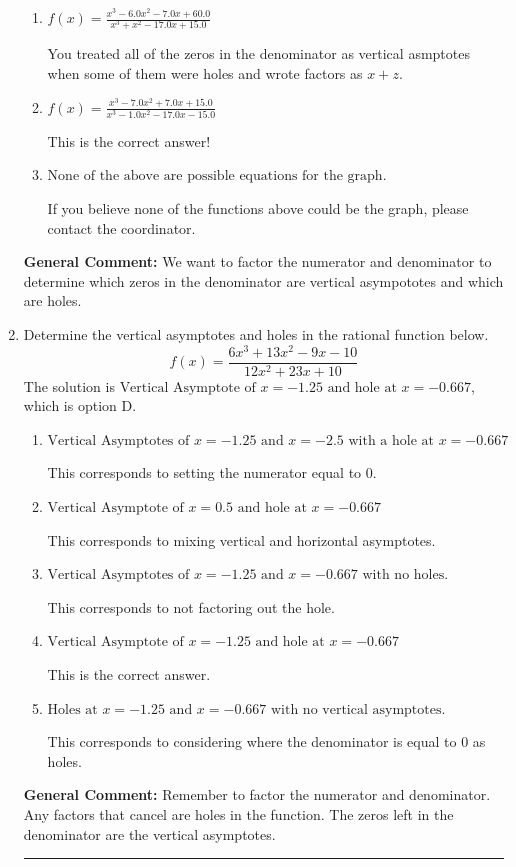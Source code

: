 \documentclass{extbook}[14pt]
\newcommand{\litem}[1]{\item #1

\rule{\textwidth}{0.4pt}}
\begin{document}
\begin{enumerate}
{\begin{enumerate}[label=\Alph*.]
You treated all of the zeros in the denominator as vertical asymptotes when some of them were holes!
\item \( f(x)=\frac{x^{3} -6.0 x^{2} -7.0 x + 60.0}{x^{3} + x^{2} -17.0 x + 15.0} \)

You treated all of the zeros in the denominator as vertical asmptotes when some of them were holes and wrote factors as $x+z$.
\item \( f(x)=\frac{x^{3} -7.0 x^{2} +7.0 x + 15.0}{x^{3} -1.0 x^{2} -17.0 x -15.0} \)

This is the correct answer!
\item \( \text{None of the above are possible equations for the graph.} \)

If you believe none of the functions above could be the graph, please contact the coordinator.
\end{enumerate}

\textbf{General Comment:} We want to factor the numerator and denominator to determine which zeros in the denominator are vertical asympototes and which are holes.
}
\litem{
Determine the vertical asymptotes and holes in the rational function below.
\[ f(x) = \frac{6x^{3} +13 x^{2} -9 x -10}{12x^{2} +23 x + 10} \]The solution is \( \text{Vertical Asymptote of } x = -1.25 \text{ and hole at } x = -0.667 \), which is option D.\begin{enumerate}[label=\Alph*.]
\item \( \text{Vertical Asymptotes of } x = -1.25 \text{ and } x = -2.5 \text{ with a hole at } x = -0.667 \)

This corresponds to setting the numerator equal to 0.
\item \( \text{Vertical Asymptote of } x = 0.5 \text{ and hole at } x = -0.667 \)

This corresponds to mixing vertical and horizontal asymptotes.
\item \( \text{Vertical Asymptotes of } x = -1.25 \text{ and } x = -0.667 \text{ with no holes.} \)

This corresponds to not factoring out the hole.
\item \( \text{Vertical Asymptote of } x = -1.25 \text{ and hole at } x = -0.667 \)

This is the correct answer.
\item \( \text{Holes at } x = -1.25 \text{ and } x = -0.667 \text{ with no vertical asymptotes.} \)

This corresponds to considering where the denominator is equal to 0 as holes.
\end{enumerate}

\textbf{General Comment:} Remember to factor the numerator and denominator. Any factors that cancel are holes in the function. The zeros left in the denominator are the vertical asymptotes.
}
\end{enumerate}
\end{document}
